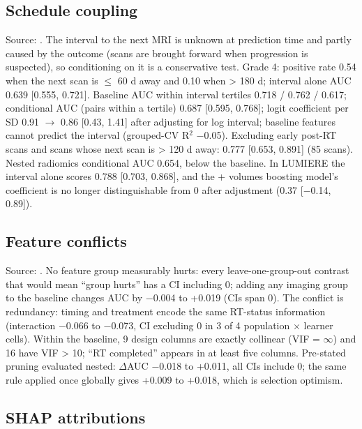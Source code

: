 \documentclass[11pt,a4paper]{article}
\begin{document}
\subsection{Schedule coupling}\label{sec:S12.4}

Source: . The interval to the next
MRI is unknown at prediction time
and partly caused by the outcome (scans are brought forward when progression is suspected), so conditioning on
it is a conservative test. Grade 4: positive rate 0.54 when the next scan is $\leq$ 60 d away and 0.10 when >
180 d; interval alone AUC 0.639 [0.555, 0.721]. Baseline AUC within interval tertiles 0.718 / 0.762 / 0.617;
conditional AUC (pairs within a tertile) 0.687 [0.595, 0.768]; logit coefficient per SD 0.91 $\rightarrow$
0.86 [0.43, 1.41] after adjusting for log interval; baseline features cannot predict the interval (grouped-CV
R$^{2}$ $-$0.05). Excluding early post-RT scans and scans whose next scan is > 120 d away: 0.777 [0.653,
0.891] (85 scans). Nested radiomics conditional AUC 0.654, below the baseline. In LUMIERE the interval alone
scores 0.788 [0.703, 0.868], and the + volumes boosting model's coefficient is no longer distinguishable from
0 after adjustment (0.37 [$-$0.14, 0.89]).

\subsection{Feature conflicts}\label{sec:S12.5}

Source: . No feature group
measurably hurts: every
leave-one-group-out contrast that would mean ``group hurts'' has a CI including 0; adding any imaging group to
the baseline changes AUC by $-$0.004 to +0.019 (CIs span 0). The conflict is redundancy: timing and treatment
encode the same RT-status information (interaction $-$0.066 to $-$0.073, CI excluding 0 in 3 of 4 population
$\times$ learner cells). Within the baseline, 9 design columns are exactly collinear (VIF = $\infty$) and 16
have VIF > 10; ``RT completed'' appears in at least five columns. Pre-stated pruning evaluated nested:
$\Delta$AUC $-$0.018 to +0.011, all CIs include 0; the same rule applied once globally gives +0.009 to +0.018,
which is selection optimism.

\subsection{SHAP attributions}\label{sec:S12.6}
\end{document}
